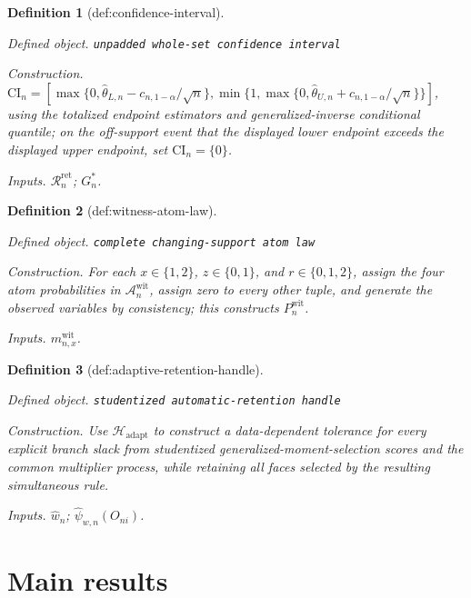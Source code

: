 \documentclass{article}
\newtheorem{definition}{Definition}
\begin{document}
\begin{definition}[def:confidence-interval]\label{def:confidence-interval}
\par\smallskip\noindent\emph{Defined object.} \texttt{unpadded whole-\allowbreak{}set confidence interval}
\par\smallskip\noindent\emph{Construction.} \(\mathrm{CI}_n=[\max\{0,\widehat\theta_{L,n}-c_{n,1-\alpha}/\sqrt n\},\min\{1,\max\{0,\widehat\theta_{U,n}+c_{n,1-\alpha}/\sqrt n\}\}]\), using the totalized endpoint estimators and generalized-inverse conditional quantile; on the off-support event that the displayed lower endpoint exceeds the displayed upper endpoint, set \(\mathrm{CI}_n=\{0\}\).
\par\smallskip\noindent\emph{Inputs.} \(\mathcal R_n^{\mathrm{ret}}\); \(G_n^*\).
\end{definition}

\begin{definition}[def:witness-atom-law]\label{def:witness-atom-law}
\par\smallskip\noindent\emph{Defined object.} \texttt{complete changing-\allowbreak{}support atom law}
\par\smallskip\noindent\emph{Construction.} For each \(x\in\{1,2\}\), \(z\in\{0,1\}\), and \(r\in\{0,1,2\}\), assign the four atom probabilities in \(\mathcal A_n^{\mathrm{wit}}\), assign zero to every other tuple, and generate the observed variables by consistency; this constructs \(P_n^{\mathrm{wit}}\).
\par\smallskip\noindent\emph{Inputs.} \(m^{\mathrm{wit}}_{n,x}\).
\end{definition}

\begin{definition}[def:adaptive-retention-handle]\label{def:adaptive-retention-handle}
\par\smallskip\noindent\emph{Defined object.} \texttt{studentized automatic-\allowbreak{}retention handle}
\par\smallskip\noindent\emph{Construction.} Use \(\mathcal H_{\mathrm{adapt}}\) to construct a data-dependent tolerance for every explicit branch slack from studentized generalized-moment-selection scores and the common multiplier process, while retaining all faces selected by the resulting simultaneous rule.
\par\smallskip\noindent\emph{Inputs.} \(\widehat w_n\); \(\widehat\psi_{w,n}(O_{ni})\).
\end{definition}

\section{Main results}
\end{document}
